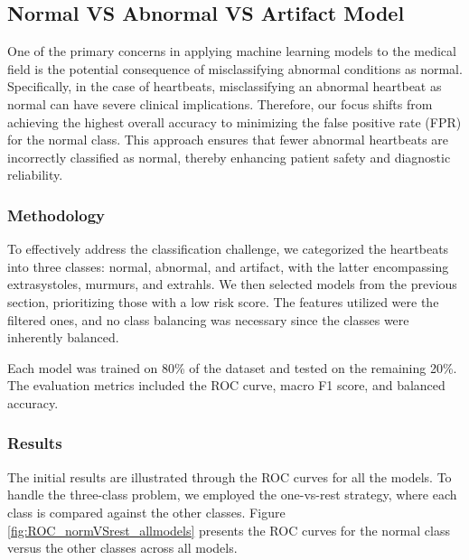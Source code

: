 \subsection{Normal VS Abnormal VS Artifact Model}
One of the primary concerns in applying machine learning models to the medical field is the potential 
consequence of misclassifying abnormal conditions as normal. Specifically, in the case of heartbeats, 
misclassifying an abnormal heartbeat as normal can have severe clinical implications. Therefore, 
our focus shifts from achieving the highest overall accuracy to minimizing the false positive rate (FPR) 
for the normal class. This approach ensures that fewer abnormal heartbeats are incorrectly classified as 
normal, thereby enhancing patient safety and diagnostic reliability.

\subsubsection{Methodology}
To effectively address the classification challenge, we categorized the heartbeats into three classes: 
normal, abnormal, and artifact, with the latter encompassing extrasystoles, murmurs, and extrahls. 
We then selected models from the previous section, prioritizing those with a low risk score. 
The features utilized were the filtered ones, and no class balancing was necessary since the classes 
were inherently balanced.

Each model was trained on 80\% of the dataset and tested on the remaining 20\%. 
The evaluation metrics included the ROC curve, macro F1 score, and balanced accuracy.


\subsubsection{Results}
The initial results are illustrated through the ROC curves for all the models. 
To handle the three-class problem, we employed the one-vs-rest strategy, where each class is compared 
against the other classes. Figure \ref{fig:ROC_normVSrest_allmodels} presents the ROC curves for 
the normal class versus the other classes across all models.


